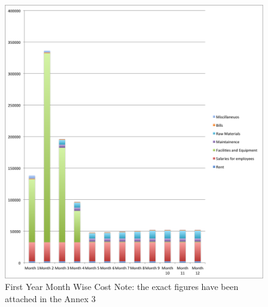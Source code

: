 \documentclass[11pt]{article}
\begin{document}
	\begin{figure}[h!]
	\caption{First Year Month Wise Cost \n Note: the exact figures have been attached in the Annex 3}
	\centering
	\includegraphics[width=\textwidth]{month_wise_cost.png}
	\end{figure}
\end{document}
